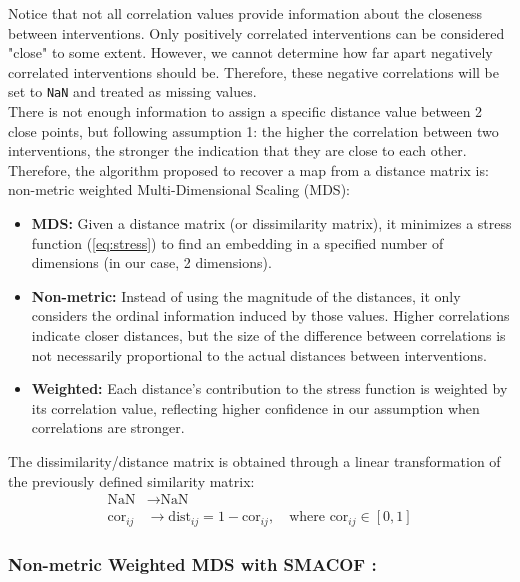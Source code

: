 Notice that not all correlation values provide information about the closeness between interventions. Only positively correlated interventions can be considered "close" to some extent. However, we cannot determine how far apart negatively correlated interventions should be. Therefore, these negative correlations will be set to \texttt{NaN} and treated as missing values.\\

There is not enough information to assign a specific distance value between 2 close points, but following assumption 1: the higher the correlation between two interventions, the stronger the indication that they are close to each other. Therefore, the algorithm proposed to recover a map from a distance matrix is: non-metric weighted Multi-Dimensional Scaling (MDS):

\begin{itemize}
    \item \textbf{MDS:} Given a distance matrix (or dissimilarity matrix), it minimizes a stress function (\ref{eq:stress}) to find an embedding in a specified number of dimensions (in our case, 2 dimensions).
    \item \textbf{Non-metric:} Instead of using the magnitude of the distances, it only considers the ordinal information induced by those values. Higher correlations indicate closer distances, but the size of the difference between correlations is not necessarily proportional to the actual distances between interventions.
    \item \textbf{Weighted:} Each distance's contribution to the stress function is weighted by its correlation value, reflecting higher confidence in our assumption when correlations are stronger.
\end{itemize}

\begin{remark}
    The dissimilarity/distance matrix is obtained through a linear transformation of the previously defined similarity matrix:
    \begin{align*}
        \text{NaN} &\rightarrow \text{NaN} \\
        \text{cor}_{ij} &\rightarrow \text{dist}_{ij} = 1-\text{cor}_{ij}, \quad \text{where } \text{cor}_{ij} \in [0,1]
    \end{align*}
\end{remark}


\subsubsection*{Non-metric Weighted MDS with SMACOF \cite{smacof}:}
